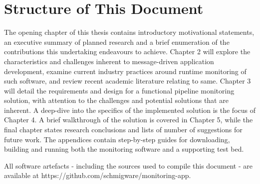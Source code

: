 \section{Structure of This Document}
The opening chapter of this thesis contains introductory motivational statements, an executive summary of planned research and a brief enumeration of the contributions this undertaking endeavours to achieve. Chapter 2 will explore the characteristics and challenges inherent to message-driven application development, examine current industry practices around runtime monitoring of such software, and review recent academic literature relating to same. Chapter 3 will detail the requirements and design for a functional pipeline monitoring solution, with attention to the challenges and potential solutions that are inherent. A deep-dive into the specifics of the implemented solution is the focus of Chapter 4. A brief walkthrough of the solution is covered in Chapter 5, while the final chapter states research conclusions and lists of number of suggestions for future work. The appendices contain step-by-step guides for downloading, building and running both the monitoring software and a supporting test bed. 

All software artefacts - including the sources used to compile this document - are available at https://github.com/schmigware/monitoring-app.

